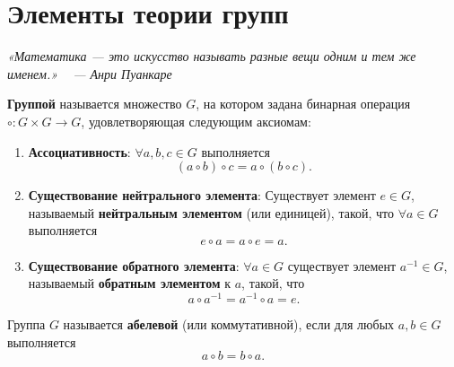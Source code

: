 \chapter{Элементы теории групп}

\begin{flushright}
\small
\itshape
«Математика — это искусство называть разные вещи одним и тем же именем.» \
\upshape
— Анри Пуанкаре
\end{flushright}

\begin{shdef}
    \begin{definition} [Группа]
    \leavevmode \nl

    \textbf{Группой} называется множество \( G \), на котором задана бинарная операция \( \circ : G \times G \to G \), удовлетворяющая следующим аксиомам:
\begin{enumerate}
    \item \textbf{Ассоциативность}: \(\forall a, b, c \in G \) выполняется
    \[
    (a \circ b) \circ c = a \circ (b \circ c).
    \]
    \item \textbf{Существование нейтрального элемента}: Существует элемент \( e \in G \), \\называемый \textbf{нейтральным элементом} (или единицей), такой, что \(\forall a \in G \) выполняется
    \[
    e \circ a = a \circ e = a.
    \]
    \item \textbf{Существование обратного элемента}: \(\forall a \in G \) существует элемент \( a^{-1} \in G \), называемый \textbf{обратным элементом} к \( a \), такой, что
    \[
    a \circ a^{-1} = a^{-1} \circ a = e.
    \]
    \end{enumerate}
    \end{definition}
\end{shdef}

\begin{shdef}
    \begin{definition} 
    \leavevmode \nl

    Группа \( G \) называется \textbf{абелевой} (или коммутативной), если для любых \( a, b \in G \) выполняется
    \[
    a \circ b = b \circ a.
    \]
    \end{definition}
\end{shdef}

